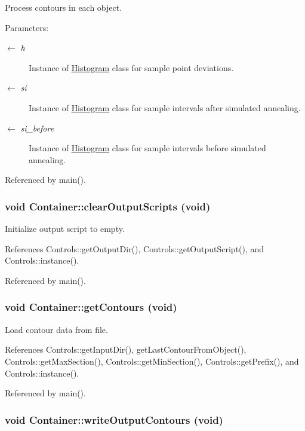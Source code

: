 Process contours in each object. \begin{Desc}
\item[Parameters:]
\begin{description}
\item[\mbox{$\leftarrow$} {\em h}]Instance of \hyperlink{classHistogram}{Histogram} class for sample point deviations. \item[\mbox{$\leftarrow$} {\em si}]Instance of \hyperlink{classHistogram}{Histogram} class for sample intervals after simulated annealing. \item[\mbox{$\leftarrow$} {\em si\_\-before}]Instance of \hyperlink{classHistogram}{Histogram} class for sample intervals before simulated annealing. \end{description}
\end{Desc}


Referenced by main().\hypertarget{classContainer_644b795e93a137c9eef2c6c1fa53a72f}{
\subsubsection[clearOutputScripts]{\setlength{\rightskip}{0pt plus 5cm}void Container::clearOutputScripts (void)}}
\label{classContainer_644b795e93a137c9eef2c6c1fa53a72f}


Initialize output script to empty. 

References Controls::getOutputDir(), Controls::getOutputScript(), and Controls::instance().

Referenced by main().\hypertarget{classContainer_7bf4bb6083f930f0896e4b0bb583344f}{
\subsubsection[getContours]{\setlength{\rightskip}{0pt plus 5cm}void Container::getContours (void)}}
\label{classContainer_7bf4bb6083f930f0896e4b0bb583344f}


Load contour data from file. 

References Controls::getInputDir(), getLastContourFromObject(), Controls::getMaxSection(), Controls::getMinSection(), Controls::getPrefix(), and Controls::instance().

Referenced by main().\hypertarget{classContainer_f9c135209162b0ea5e8395e982241f0d}{
\subsubsection[writeOutputContours]{\setlength{\rightskip}{0pt plus 5cm}void Container::writeOutputContours (void)}}
\label{classContainer_f9c135209162b0ea5e8395e982241f0d}


